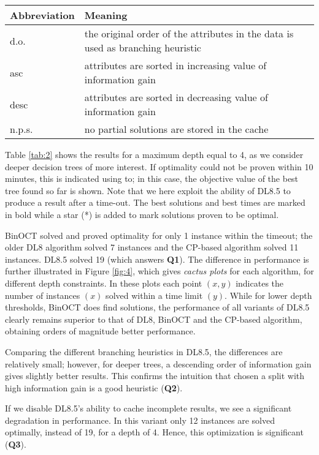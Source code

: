 \noindent\begin{tabularx}{\linewidth}{lX}
	Abbreviation	& Meaning		\\\hline
	d.o.			& the original order of the attributes in the data is used as branching heuristic		\\
	asc				& attributes are sorted in increasing value of information gain		\\
	desc			& attributes are sorted in decreasing value of information gain		\\
	n.p.s.			& no partial solutions are stored in the cache
\end{tabularx}

Table \ref{tab:2} shows the results for a maximum depth equal to 4, as we consider deeper decision trees of more interest. If optimality could not be proven within 10 minutes, this is indicated using to; in this case, the objective value of the best tree found so far is shown. Note that we here exploit the ability of DL8.5 to produce a result after a time-out. The best solutions and best times are marked in bold while a star (*) is added to mark solutions proven to be optimal.

BinOCT solved and proved optimality for only 1 instance within the timeout; the older DL8 algorithm solved 7 instances and the CP-based algorithm solved 11 instances. DL8.5 solved 19 (which answers \textbf{Q1}). The difference in performance is further illustrated in Figure \ref{fig:4}, which gives \emph{cactus plots} for each algorithm, for different depth constraints. In these plots each point $(x, y)$ indicates the number of instances $(x)$ solved within a time limit $(y)$. While for lower depth thresholds, BinOCT does find solutions, the performance of all variants of DL8.5 clearly remains superior to that of DL8, BinOCT and the CP-based algorithm, obtaining orders of magnitude better performance.

Comparing the different branching heuristics in DL8.5, the differences are relatively small; however, for deeper trees, a descending order of information gain gives slightly better results. This confirms the intuition that chosen a split with high information gain is a good heuristic (\textbf{Q2}).

If we disable DL8.5’s ability to cache incomplete results, we see a significant degradation in performance. In this variant only 12 instances are solved optimally, instead of 19, for a depth of 4. Hence, this optimization is significant (\textbf{Q3}).

